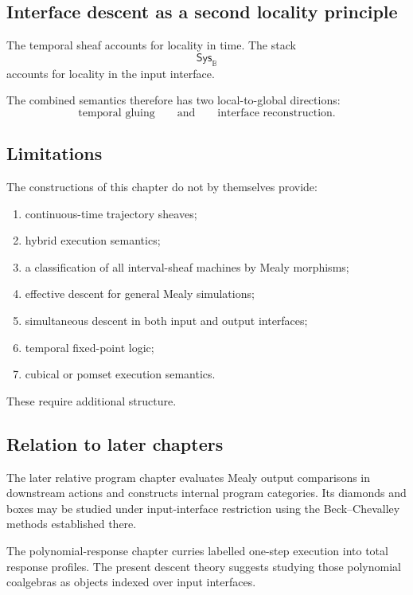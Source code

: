\subsection{Interface descent as a second locality principle}
\label{subsec:interface-descent-second-locality}

The temporal sheaf accounts for locality in time. The stack
\[
    \mathsf{Sys}_{\mathbb B}
\]
accounts for locality in the input interface.

The combined semantics therefore has two local-to-global directions:
\[
    \text{temporal gluing}
    \qquad\text{and}\qquad
    \text{interface reconstruction}.
\]

\subsection{Limitations}
\label{subsec:limitations-temporal-interface}

The constructions of this chapter do not by themselves provide:
\begin{enumerate}
    \item continuous-time trajectory sheaves;
    \item hybrid execution semantics;
    \item a classification of all interval-sheaf machines by Mealy
    morphisms;
    \item effective descent for general Mealy simulations;
    \item simultaneous descent in both input and output interfaces;
    \item temporal fixed-point logic;
    \item cubical or pomset execution semantics.
\end{enumerate}

These require additional structure.

\subsection{Relation to later chapters}
\label{subsec:relation-later-chapters}

The later relative program chapter evaluates Mealy output comparisons in
downstream actions and constructs internal program categories. Its diamonds
and boxes may be studied under input-interface restriction using the
Beck--Chevalley methods established there.

The polynomial-response chapter curries labelled one-step execution into total
response profiles. The present descent theory suggests studying those
polynomial coalgebras as objects indexed over input interfaces.

